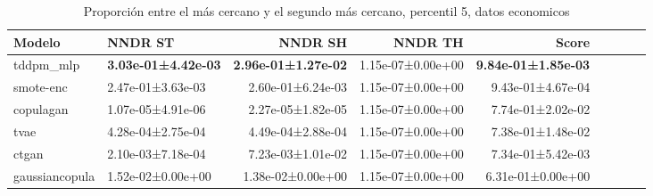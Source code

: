 \begin{table}[H]
\centering
\fontsize{10}{14}\selectfont
\caption{Proporción entre el más cercano y el segundo más cercano, percentil 5, datos economicos}
\label{table-nndr-economicos-b-5th}
\begin{tabular}{|l|l|r|r|r|r|r|r|r|}
\hline
\rowcolor[gray]{0.8}
Modelo & NNDR ST & NNDR SH & NNDR TH & \textbf{Score} \\
\hline tddpm\_mlp & \bfseries 3.03e-01±4.42e-03 & \bfseries 2.96e-01±1.27e-02 & 1.15e-07±0.00e+00 & \bfseries 9.84e-01±1.85e-03 \\
\hline smote-enc & 2.47e-01±3.63e-03 & 2.60e-01±6.24e-03 & 1.15e-07±0.00e+00 & 9.43e-01±4.67e-04 \\
\hline copulagan & \cellcolor[rgb]{0.9, 0.54, 0.52} 1.07e-05±4.91e-06 & \cellcolor[rgb]{0.9, 0.54, 0.52} 2.27e-05±1.82e-05 & 1.15e-07±0.00e+00 & 7.74e-01±2.02e-02 \\
\hline tvae & 4.28e-04±2.75e-04 & 4.49e-04±2.88e-04 & 1.15e-07±0.00e+00 & 7.38e-01±1.48e-02 \\
\hline ctgan & 2.10e-03±7.18e-04 & 7.23e-03±1.01e-02 & 1.15e-07±0.00e+00 & 7.34e-01±5.42e-03 \\
\hline gaussiancopula & 1.52e-02±0.00e+00 & 1.38e-02±0.00e+00 & 1.15e-07±0.00e+00 & \cellcolor[rgb]{0.9, 0.54, 0.52} 6.31e-01±0.00e+00 \\
\hline
\end{tabular}
\end{table}
